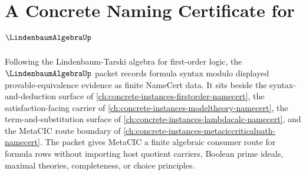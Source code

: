 \chapter{A Concrete Naming Certificate for $\LindenbaumAlgebraUp$}
\label{ch:concrete-instances-lindenbaum-algebra-namecert}

Following the Lindenbaum-Tarski algebra for first-order logic, the $\LindenbaumAlgebraUp$ packet records formula syntax modulo displayed provable-equivalence evidence as finite NameCert data. It sits beside the syntax-and-deduction surface of \autoref{ch:concrete-instances-firstorder-namecert}, the satisfaction-facing carrier of \autoref{ch:concrete-instances-modeltheory-namecert}, the term-and-substitution surface of \autoref{ch:concrete-instances-lambdacalc-namecert}, and the MetaCIC route boundary of \autoref{ch:concrete-instances-metaciccriticalpath-namecert}. The packet gives MetaCIC a finite algebraic consumer route for formula rows without importing host quotient carriers, Boolean prime ideals, maximal theories, completeness, or choice principles.

